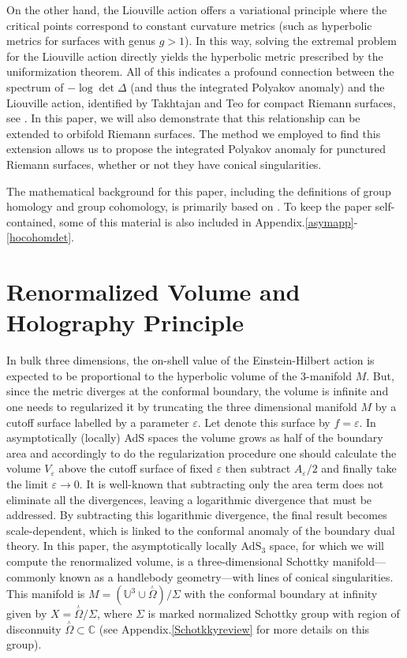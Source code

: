 \documentclass[a4paper,11pt]{article}
\newcommand{\singrigon}{\overset{{}_{\curlywedge}}{\Omega}}
\begin{document}
On the other hand, the Liouville action offers a variational principle where the critical points correspond to constant curvature metrics (such as hyperbolic metrics for surfaces with genus $g>1$). In this way, solving the extremal problem for the Liouville action directly yields the hyperbolic metric prescribed by the uniformization theorem. All of this indicates a profound connection between the spectrum of $-\log\det\Delta$ (and thus the integrated Polyakov anomaly)  and the Liouville action, identified by Takhtajan and Teo for compact Riemann surfaces, see \cite{Takhtajan_2003}. In this paper, we will also demonstrate that this relationship can be extended to orbifold Riemann surfaces. The method we employed to find this extension allows us to propose the integrated Polyakov anomaly for punctured Riemann surfaces, whether or not they have conical singularities.

The mathematical background for this paper, including the definitions of group homology and group cohomology, is primarily based on \cite{Aldrovandi_1997}. To keep the paper self-contained, some of this material is also included in Appendix.\ref{asymapp}-\ref{hocohomdet}.
\section{Renormalized Volume and Holography Principle}\label{Renvolume}

In bulk three dimensions, the on-shell value of the Einstein-Hilbert action is expected to be proportional to the hyperbolic volume of the 3-manifold $M$. But, since the metric diverges at the conformal boundary, the volume is  infinite and one needs to regularized it by truncating the three dimensional manifold $M$ by a cutoff surface labelled by a parameter $\varepsilon$. Let denote this surface by $f= \varepsilon$. In asymptotically (locally) AdS spaces the volume grows as half of the boundary area and accordingly to do the regularization procedure one should calculate the volume $V_{\varepsilon}$ above the cutoff  surface of fixed $\varepsilon$ then subtract $A_{\varepsilon}/2$ and finally take the limit $\varepsilon \rightarrow 0$. It is well-known that subtracting only the area term does not eliminate all the divergences, leaving a logarithmic divergence that must be addressed. By subtracting this logarithmic divergence, the final result becomes scale-dependent, which is linked to the conformal anomaly of the boundary dual theory. In this paper, the asymptotically locally  $\text{AdS}_3$ space, for which we will compute the renormalized volume, is a three-dimensional Schottky manifold—commonly known as a handlebody geometry—with lines of conical singularities. This manifold is $M=(\mathbb{U}^3\cup\singrigon)\slash\Sigma$ with the conformal boundary at infinity given by $X=\singrigon\slash\Sigma$, where $\Sigma$ is marked normalized Schottky group with region of disconnuity $\singrigon\subset \mathbb{C}$ (see Appendix.\ref{Schotkkyreview} for more details on this group).
\end{document}
